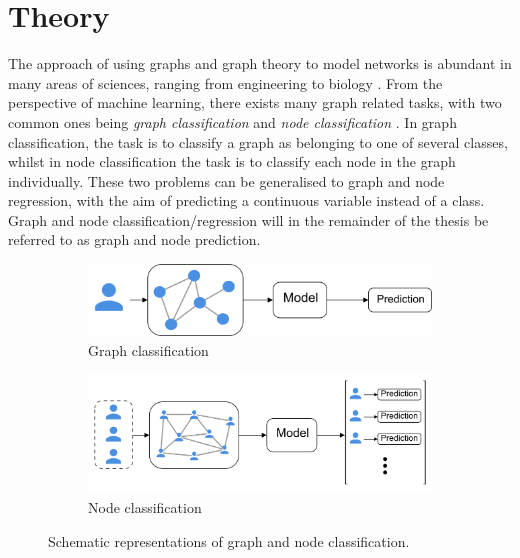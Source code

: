 \chapter{Theory}
\label{chap:theory}

The approach of using graphs and graph theory to model networks is abundant in many areas of sciences, ranging from engineering to biology \cite{network_science_chap1}. From the perspective of machine learning, there exists many graph related tasks, with two common ones being \textit{graph classification} and \textit{node classification} \cite{quadratic_graph_classification, active_learning_node_classification}. In graph classification, the task is to classify a graph as belonging to one of several classes, whilst in node classification the task is to classify each node in the graph individually. These two problems can be generalised to graph and node regression, with the aim of predicting a continuous variable instead of a class. Graph and node classification/regression will in the remainder of the thesis be referred to as graph and node prediction. 
%         

\begin{figure}[!htbp]
    \centering
        \begin{subfigure}{.5\textwidth}
            \centering
            \includegraphics[width=0.95\linewidth]{chapters/images_theory/graph_classification_v2.png}
            \caption{Graph classification}
            \label{fig:subject_prediction}
        \end{subfigure}%
        \begin{subfigure}{.5\textwidth}
            \centering
            \includegraphics[width=0.95\linewidth]{chapters/images_theory/population_node_classification.png}
            \caption{Node classification}
            \label{fig:population_prediction}
        \end{subfigure}
    \caption{Schematic representations of graph and node classification.}
    \label{fig:graph_and_node_class}
\end{figure}

